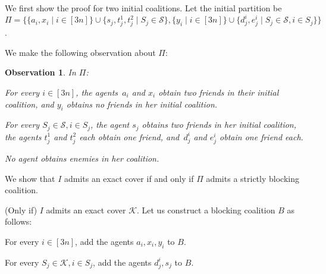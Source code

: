 \documentclass[a4paper,fleqn]{cas-sc}
\newcommand{\partition}{\ensuremath{\Pi}\xspace}
\newcommand{\blockingCoalition}{\ensuremath{B}\xspace}
\newtheorem{obs}{Observation}
\newcommand{\sets}{\ensuremath{\mathcal{S}}}
\newcommand{\elements}{\ensuremath{[3n]}}
\newcommand{\sset}[1]{\ensuremath{S_{#1}}}
\newcommand{\ecov}{\ensuremath{\mathcal{K}}}
\begin{document}
{We first show the proof for two initial coalitions.
Let the initial partition be $\partition = \{\{a_i, x_i \mid i \in \elements\} \cup \{s_j, t^1_j, t^2_j \mid \sset j \in \sets\}, \{y_i \mid i \in \elements\} \cup \{d^i_j, e^i_j \mid \sset j \in \sets, i \in \sset j\}\}$.

We make the following observation about $\partition$:
\begin{obs}\label{obs:cvfriends}
In \partition:
\begin{compactenum}[(i)]
\item For every $i \in \elements$, the agents~$a_i$ and $x_i$ obtain two friends in their initial coalition, and $y_i$ obtains no friends in her initial coalition.\label{obs:cvfriendsi}
\item For every $\sset j \in \sets, i \in \sset j$, the agent $s_j$ obtains two friends in her initial coalition, the agents $t^1_j$ and $t^2_j$ each obtain one friend, and~$d^i_j$ and $e^i_j$ obtain one friend each.\label{obs:cvfriendss}
\item No agent obtains enemies in her coalition.
\end{compactenum}
\end{obs}


We show that $I$ admits an exact cover if and only if $\partition$ admits a strictly blocking coalition.

(Only if) $I$ admits an exact cover \ecov.
Let us construct a blocking coalition $\blockingCoalition$ as follows:
\begin{compactitem}
\item For every $i \in \elements$, add the agents $a_i, x_i, y_i$ to $\blockingCoalition$.
\item For every $\sset j \in \ecov, i \in \sset j$, add the agents $d^i_j, s_j$ to $\blockingCoalition$.
\end{compactitem}

}
\end{document}
